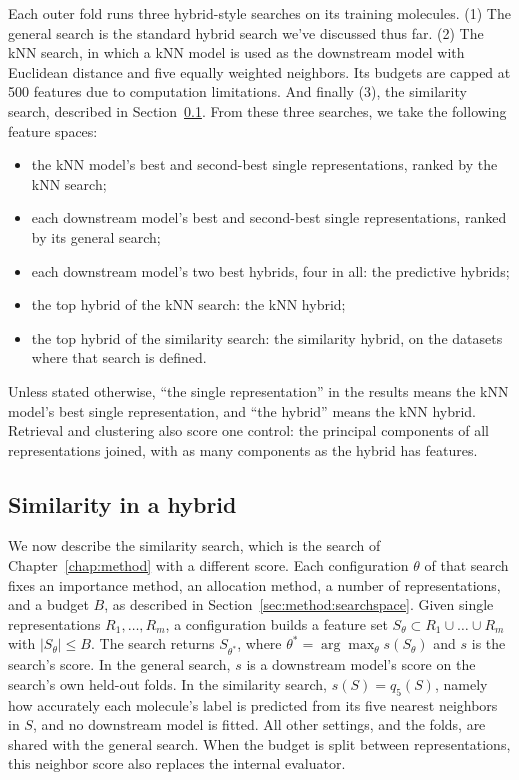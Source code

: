 Each outer fold runs three hybrid-style searches on its training molecules. (1) The general search is the standard hybrid search we've discussed thus far. (2) The kNN search, in which a kNN model is used as the downstream model with Euclidean distance and five equally weighted neighbors. Its budgets are capped at 500 features due to computation limitations. And finally (3), the similarity search, described in Section~\ref{sec:similarity:hybrid_similarity}. From these three searches, we take the following feature spaces:
\begin{itemize}
    \item the kNN model's best and second-best single representations, ranked by the kNN search;
    \item each downstream model's best and second-best single representations, ranked by its general search;
    \item each downstream model's two best hybrids, four in all: the predictive hybrids;
    \item the top hybrid of the kNN search: the kNN hybrid;
    \item the top hybrid of the similarity search: the similarity hybrid, on the datasets where that search is defined.
\end{itemize}

Unless stated otherwise, ``the single representation'' in the results means the kNN model's best single representation, and ``the hybrid'' means the kNN hybrid. Retrieval and clustering also score one control: the principal components of all representations joined, with as many components as the hybrid has features.

\subsection{Similarity in a hybrid}\label{sec:similarity:hybrid_similarity}

We now describe the similarity search, which is the search of Chapter~\ref{chap:method} with a different score. Each configuration $\theta$ of that search fixes an importance method, an allocation method, a number of representations, and a budget $B$, as described in Section~\ref{sec:method:searchspace}. Given single representations $R_1, \dots, R_m$, a configuration builds a feature set $S_\theta \subset R_1 \cup \dots \cup R_m$ with $|S_\theta| \le B$. The search returns $S_{\theta^*}$, where $\theta^* = \arg\max_\theta s(S_\theta)$ and $s$ is the search's score. In the general search, $s$ is a downstream model's score on the search's own held-out folds. In the similarity search, $s(S) = q_5(S)$, namely how accurately each molecule's label is predicted from its five nearest neighbors in $S$, and no downstream model is fitted. All other settings, and the folds, are shared with the general search. When the budget is split between representations, this neighbor score also replaces the internal evaluator.

